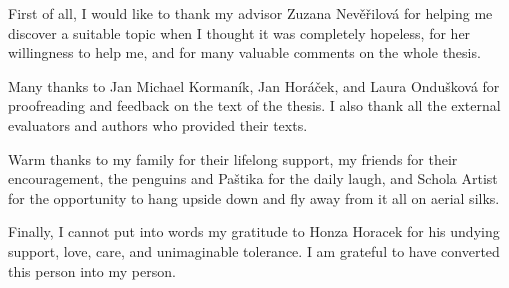 First of all, I would like to thank my advisor Zuzana Nevěřilová for helping me discover a suitable topic when I thought it was completely hopeless, for her willingness to help me, and for many valuable comments on the whole thesis.

Many thanks to Jan Michael Kormaník, Jan Horáček, and Laura Ondušková for proofreading and feedback on the text of the thesis. I also thank all the external evaluators and authors who provided their texts.

Warm thanks to my family for their lifelong support, my friends for their encouragement, the penguins and Paštika for the daily laugh, and Schola Artist for the opportunity to hang upside down and fly away from it all on aerial silks.

Finally, I cannot put into words my gratitude to Honza Horacek for his undying support, love, care, and unimaginable tolerance. I am grateful to have converted this person into my person.
